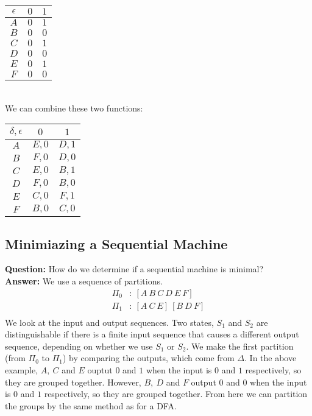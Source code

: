\documentclass{scrartcl}
\begin{document}
\begin{minipage}{0.45\linewidth}\centering
\begin{tabular} {|c|c c|}
\hline
$\epsilon$&$0$&$1$\\
\hline
$A$ & $0$ & $1$\\
$B$ & $0$ & $0$\\
$C$ & $0$ & $1$\\
$D$ & $0$ & $0$\\
$E$ & $0$ & $1$\\
$F$ & $0$ & $0$\\
\hline
\end{tabular}
\end{minipage}\\

We can combine these two functions:\\
\begin{center}
\begin{tabular} {|c|c c|}
\hline
$\delta,\epsilon$&$0$&$1$\\
\hline
$A$ & $E,0$ & $D,1$\\
$B$ & $F,0$ & $D,0$\\
$C$ & $E,0$ & $B,1$\\
$D$ & $F,0$ & $B,0$\\
$E$ & $C,0$ & $F,1$\\
$F$ & $B,0$ & $C,0$\\
\hline
\end{tabular}
\end{center}

\subsection{Minimiazing a Sequential Machine}
\textbf{Question: } How do we determine if a sequential machine is minimal?\\

\textbf{Answer: } We use a sequence of partitions.
\begin{align*}
\Pi_0&:\ [A\ B\ C\ D\ E\ F]\\
\Pi_1&:\ [A\ C\ E]\ [B\ D\ F]\\
\end{align*}
We look at the input and output sequences. Two states, $S_1$ and $S_2$ are distinguishable if there is a finite input sequence that causes a different output sequence, depending on whether we use $S_1$ or $S_2$. We make the first partition (from $\Pi_0$ to $\Pi_1$) by comparing the outputs, which come from $\Delta$. In the above example, $A,\ C$ and $E$ ouptut $0$ and $1$ when the input is $0$ and $1$ respectively, so they are grouped together. However, $B,\ D$ and $F$ output $0$ and $0$ when the input is $0$ and $1$ respectively, so they are grouped together. From here we can partition the groups by the same method as for a DFA.\pagebreak
\end{document}
